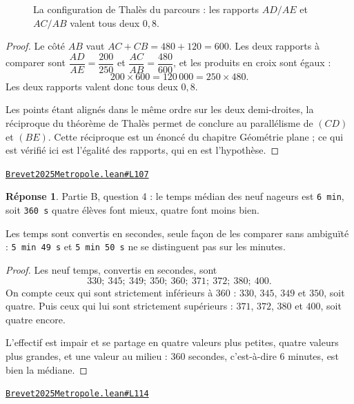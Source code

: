 \documentclass[11pt,a4paper]{article}
\theoremstyle{definition}
\theoremstyle{plain}
\theoremstyle{definition}
\newtheorem*{reponse}{Réponse}
\newcommand{\source}[2]{\par\smallskip\noindent\hfill{\footnotesize\href{#1}{\texttt{#2}}}\par\smallskip}
\begin{document}
\begin{figure}[h]
\centering

\caption{La configuration de Thalès du parcours : les rapports \(AD/AE\) et \(AC/AB\) valent tous deux \(0{,}8\).}
\end{figure}
\begin{proof}
Le côté $AB$ vaut $AC + CB = 480 + 120 = 600$. Les deux rapports à comparer sont
$\dfrac{AD}{AE} = \dfrac{200}{250}$ et $\dfrac{AC}{AB} = \dfrac{480}{600}$, et les produits
en croix sont égaux :
\[ 200 \times 600 = 120\,000 = 250 \times 480 . \]
Les deux rapports valent donc tous deux $0{,}8$.

Les points étant alignés dans le même ordre sur les deux demi-droites, la réciproque du
théorème de Thalès permet de conclure au parallélisme de $(CD)$ et $(BE)$. Cette
réciproque est un énoncé du chapitre \og{} Géométrie plane \fg{} ; ce qui est vérifié ici
est l'égalité des rapports, qui en est l'hypothèse.
\end{proof}
\source{https://github.com/Commutator-IO/learn-lean/blob/main/exams/2025/Brevet2025Metropole.lean\#L107}{Brevet2025Metropole.lean\#L107}

\begin{reponse}
Partie B, question 4 : le temps médian des neuf nageurs est \texttt{6 min}, soit
\texttt{360 s} \textemdash{} quatre élèves font mieux, quatre font moins bien.

Les temps sont convertis en secondes, seule façon de les comparer sans ambiguïté :
\texttt{5 min 49 s} et \texttt{5 min 50 s} ne se distinguent pas sur les minutes.
\end{reponse}
\begin{proof}
Les neuf temps, convertis en secondes, sont
\[ 330 ;\ 345 ;\ 349 ;\ 350 ;\ 360 ;\ 371 ;\ 372 ;\ 380 ;\ 400 . \]
On compte ceux qui sont strictement inférieurs à $360$ : $330$, $345$, $349$ et $350$,
soit quatre. Puis ceux qui lui sont strictement supérieurs : $371$, $372$, $380$ et $400$,
soit quatre encore.

L'effectif est impair et se partage en quatre valeurs plus petites, quatre valeurs plus
grandes, et une valeur au milieu : $360$ secondes, c'est-à-dire $6$ minutes, est bien la
médiane.
\end{proof}
\source{https://github.com/Commutator-IO/learn-lean/blob/main/exams/2025/Brevet2025Metropole.lean\#L114}{Brevet2025Metropole.lean\#L114}
\end{document}
